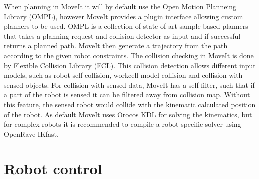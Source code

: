 When planning in MoveIt it will by default use the Open Motion Planneing Library (OMPL), however MoveIt provides a plugin interface allowing custom planners to be used. OMPL is a collection of state of art sample based planners that takes a planning request and collision detector as input and if successful returns a planned path. MoveIt then generate a trajectory from the path according to the given robot constraints. The collision checking in MoveIt is done by Flexible Collision Library (FCL). This collision detection allows different input models, such as robot self-collision, workcell model collision and collision with sensed objects. For collision with sensed data, MoveIt has a self-filter, such that if a part of the robot is sensed it can be filtered away from collision map. Without this feature, the sensed robot would collide with the kinematic calculated position of the robot. As default MoveIt uses Orocos KDL for solving the kinematics, but for complex robots it is recommended to compile a robot specific solver using OpenRave IKfast.


\section{Robot control}
\label{sec:robot_control}

%
